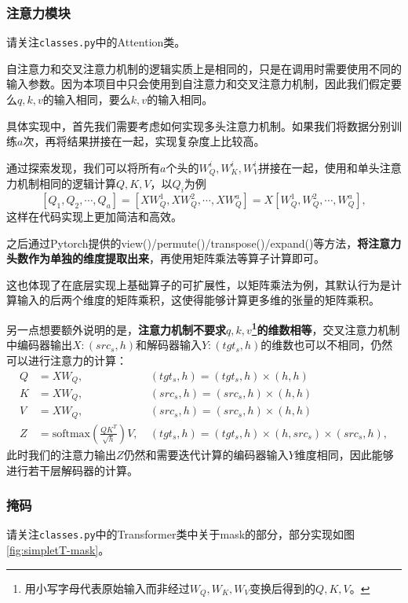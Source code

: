 \subsubsection{注意力模块}

请关注\texttt{classes.py}中的Attention类。

自注意力和交叉注意力机制的逻辑实质上是相同的，只是在调用时需要使用不同的输入参数。因为本项目中只会使用到自注意力和交叉注意力机制，因此我们假定要么$q,k,v$的输入相同，要么$k,v$的输入相同。

具体实现中，首先我们需要考虑如何实现多头注意力机制。如果我们将数据分别训练$a$次，再将结果拼接在一起，实现复杂度上比较高。

通过探索发现，我们可以将所有$a$个头的$W_Q^i,W_K^i,W_V^i$拼接在一起，使用和单头注意力机制相同的逻辑计算$Q,K,V$，以$Q_i$为例
$$
[Q_1, Q_2,\cdots , Q_a] = [XW_Q^1 , XW_Q^2 , \cdots, XW_Q^a ] = X[W_Q^1, W_Q^2, \cdots, W_Q^a],
$$
这样在代码实现上更加简洁和高效。

之后通过Pytorch提供的view()/permute()/transpose()/expand()等方法，\textbf{将注意力头数作为单独的维度提取出来}，再使用矩阵乘法等算子计算即可。

这也体现了在底层实现上基础算子的可扩展性，以矩阵乘法为例，其默认行为是计算输入的后两个维度的矩阵乘积，这使得能够计算更多维的张量的矩阵乘积。

另一点想要额外说明的是，\textbf{注意力机制不要求$q,k,v$\footnote{用小写字母代表原始输入而非经过$W_Q,W_K,W_V$变换后得到的$Q,K,V$。}的维数相等}，交叉注意力机制中编码器输出$X:(src_s,h)$和解码器输入$Y:(tgt_s,h)$的维数也可以不相同，仍然可以进行注意力的计算：
\begin{align*}
    Q &=X W_Q , \ &(tgt_s,h) = (tgt_s, h) \times (h,h) \\
    K &=X W_Q , \ &(src_s,h) = (src_s, h) \times (h,h) \\
    V &=X W_Q , \ &(src_s,h) = (src_s, h) \times (h,h) \\
    Z &= \text{softmax}(\frac{QK^T}{\sqrt{h}}) V, \ &(tgt_s, h) = (tgt_s, h) \times (h, src_s) \times (src_s, h),
\end{align*}
此时我们的注意力输出$Z$仍然和需要迭代计算的编码器输入$Y$维度相同，因此能够进行若干层解码器的计算。


\subsubsection{掩码}

请关注\texttt{classes.py}中的Transformer类中关于mask的部分，部分实现如图\ref{fig:simpletT-mask}。

